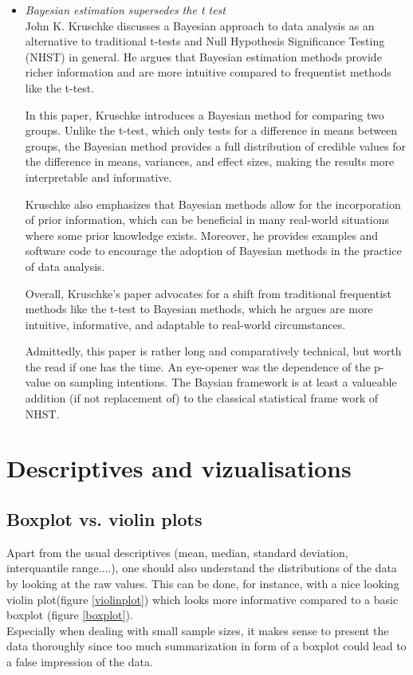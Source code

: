 \documentclass[12pt,a4paper]{article}
\begin{document}
\begin{itemize}
\item \textit{Bayesian estimation supersedes the t test} \cite{Kruschke2013}\\
John K. Kruschke discusses a Bayesian approach to data analysis as an alternative to traditional t-tests and Null Hypothesis Significance Testing (NHST) in general. He argues that Bayesian estimation methods provide richer information and are more intuitive compared to frequentist methods like the t-test.

In this paper, Kruschke introduces a Bayesian method for comparing two groups. Unlike the t-test, which only tests for a difference in means between groups, the Bayesian method provides a full distribution of credible values for the difference in means, variances, and effect sizes, making the results more interpretable and informative.

Kruschke also emphasizes that Bayesian methods allow for the incorporation of prior information, which can be beneficial in many real-world situations where some prior knowledge exists. Moreover, he provides examples and software code to encourage the adoption of Bayesian methods in the practice of data analysis.

Overall, Kruschke's paper advocates for a shift from traditional frequentist methods like the t-test to Bayesian methods, which he argues are more intuitive, informative, and adaptable to real-world circumstances.

Admittedly, this paper is rather long and comparatively technical, but worth the read if one has the time. An eye-opener was the dependence of the p-value on sampling intentions. The Baysian framework is at least a valueable addition (if not replacement of) to the classical statistical frame work of NHST. 

\end{itemize}

\section{Descriptives and vizualisations}

\subsection{Boxplot vs. violin plots}
Apart from the usual descriptives (mean, median, standard deviation, interquantile range....), one should also understand the distributions of the data by looking at the raw values. This can be done, for instance, with a nice looking violin plot(figure \ref{violinplot}) which looks more informative compared to a basic boxplot (figure \ref{boxplot}). \\
Especially when dealing with small sample sizes, it makes sense to present the data thoroughly since too much summarization in form of a boxplot could lead to a false impression of the data. 
\end{document}
